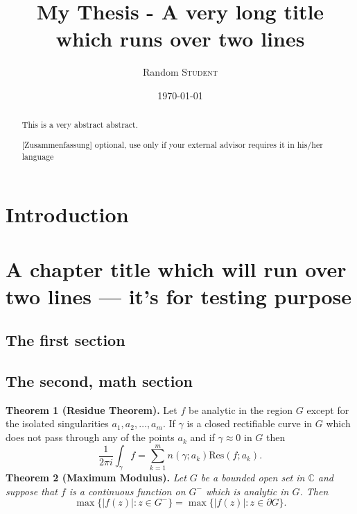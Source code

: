 \documentclass[11pt,mscthesis]{eapsthesis}
\title{My Thesis - A very long title\\ which runs over two
lines} %
\date{\today}
\author{Random \textsc{Student}}
\begin{document}
\maketitle %

\onehalfspace %
\frontmatter %

\begin{abstract}
This is a very abstract abstract. 

\lipsum
\end{abstract}

\begin{abstract}[Zusammenfassung]
optional, use only if your external advisor requires it in his/her
language 
\\

\lipsum
\end{abstract}

\begin{acknowledgements}
\lipsum 
\end{acknowledgements}

\tableofcontents 


\mainmatter

\chapter{Introduction}

\lipsum



\chapter[Short title]{A chapter title which will run over two lines --- it's for
  testing purpose}

\lipsum[1-2]

\section{The first section}
\lipsum[3-4]

 \section{The second, math section}

\textbf{Theorem 1 (Residue Theorem).}
Let $f$ be analytic in the region $G$ except for the isolated singularities $a_1,a_2,\ldots,a_m$. If $\gamma$ is a closed rectifiable curve in $G$ which does not pass through any of the points $a_k$ and if $\gamma\approx 0$ in $G$ then
\[
\frac{1}{2\pi i}\int_\gamma f = \sum_{k=1}^m n(\gamma;a_k) \text{Res}(f;a_k).
\]
\textbf{Theorem 2 (Maximum Modulus).}
\emph{Let $G$ be a bounded open set in $\mathbb{C}$ and suppose that $f$ is a continuous function on $G^-$ which is analytic in $G$. Then}
\[
\max\{|f(z)|:z\in G^-\}=\max \{|f(z)|:z\in \partial G \}.
\]
\end{document}
